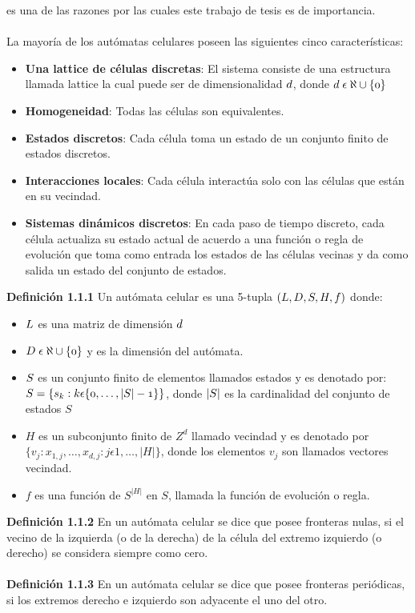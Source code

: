 es una de las razones por las cuales este trabajo de tesis es de importancia.
\\
\\
La mayoría de los autómatas celulares poseen las siguientes cinco características\citep{ilachinski2001cellular}:

\begin{itemize}
	\item{\textbf{Una lattice de células discretas}: El sistema consiste de una estructura llamada lattice la cual puede ser de dimensionalidad  $\mathnormal{d}$, donde $\mathnormal{d\; \epsilon\; \aleph\cup\{0\}}$}
	\item{\textbf{Homogeneidad}: Todas las células son equivalentes.}
	\item{\textbf{Estados discretos}: Cada célula toma un estado de un conjunto finito de estados discretos.}
	\item{\textbf{Interacciones locales}: Cada célula interactúa solo con las células que están en su vecindad.}
	\item{\textbf{Sistemas dinámicos discretos}: En cada paso de tiempo discreto, cada célula actualiza su estado actual de acuerdo a una función o regla de evolución que toma como entrada los estados de las células vecinas y da como salida un estado del conjunto de estados.}
\end{itemize}

\textbf{Definición 1.1.1} Un autómata celular es una 5-tupla $\mathnormal{(L, D, S, H, f)}$ donde:
\begin{itemize}
	\item $\mathnormal{L}$ es una matriz de dimensión $\mathnormal{d}$
	\item $\mathnormal{D\; \epsilon\; \aleph\cup\{0\}}$ y es la dimensión del autómata.
	\item $\mathnormal{S}$ es un conjunto finito de elementos llamados estados y es denotado por:
	\\
	$\mathnormal{S=\{s_{k}:k \epsilon \{0,\dots,|S|-1\}\}}$, donde $\mathnormal{|S|}$ es la cardinalidad del conjunto de estados $S$
	\item $H$ es un subconjunto finito de $Z^{d}$ llamado vecindad y es denotado por $\{v_{j}:x_{1,j},\dots,x_{d,j}:j\epsilon1,\dots,|H|\}$, donde los elementos $v_{j}$ son llamados vectores vecindad.
	\item $f$ es una función de $S^{|H|}$ en $S$, llamada la función de evolución o regla.
\end{itemize}
\textbf{Definición 1.1.2} En un autómata celular se dice que posee fronteras nulas, si el vecino de la izquierda (o de la derecha) de la célula del extremo izquierdo (o derecho) se considera siempre como cero.
\\
\\
\textbf{Definición 1.1.3} En un autómata celular se dice que posee fronteras periódicas, si los extremos derecho
e izquierdo son adyacente el uno del otro.

